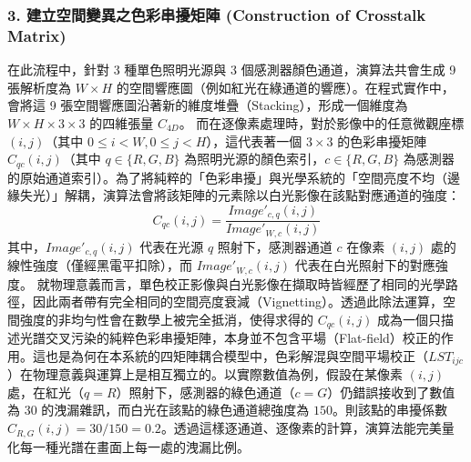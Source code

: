 \subsubsection*{3. 建立空間變異之色彩串擾矩陣 (Construction of Crosstalk Matrix)}
在此流程中，針對 3 種單色照明光源與 3 個感測器顏色通道，演算法共會生成 9 張解析度為 $W \times H$ 的空間響應圖（例如紅光在綠通道的響應）。在程式實作中，會將這 9 張空間響應圖沿著新的維度堆疊（Stacking），形成一個維度為 $W \times H \times 3 \times 3$ 的四維張量 $C_{4D}$。
而在逐像素處理時，對於影像中的任意微觀座標 $(i, j)$（其中 $0 \leq i < W, 0 \leq j < H$），這代表著一個 $3 \times 3$ 的色彩串擾矩陣 $C_{qc}(i, j)$（其中 $q \in \{R, G, B\}$ 為照明光源的顏色索引，$c \in \{R, G, B\}$ 為感測器的原始通道索引）。為了將純粹的「色彩串擾」與光學系統的「空間亮度不均（邊緣失光）」解耦，演算法會將該矩陣的元素除以白光影像在該點對應通道的強度：
\begin{equation}
    C_{qc}(i, j) = \frac{Image'_{c, q}(i, j)}{Image'_{W, c}(i, j)}
\end{equation}
其中，$Image'_{c, q}(i, j)$ 代表在光源 $q$ 照射下，感測器通道 $c$ 在像素 $(i, j)$ 處的線性強度（僅經黑電平扣除），而 $Image'_{W, c}(i, j)$ 代表在白光照射下的對應強度。
就物理意義而言，單色校正影像與白光影像在擷取時皆經歷了相同的光學路徑，因此兩者帶有完全相同的空間亮度衰減（Vignetting）。透過此除法運算，空間強度的非均勻性會在數學上被完全抵消，使得求得的 $C_{qc}(i, j)$ 成為一個只描述光譜交叉污染的純粹色彩串擾矩陣，本身並不包含平場（Flat-field）校正的作用。這也是為何在本系統的四矩陣耦合模型中，色彩解混與空間平場校正（$LST_{ijc}$）在物理意義與運算上是相互獨立的。以實際數值為例，假設在某像素 $(i, j)$ 處，在紅光（$q=R$）照射下，感測器的綠色通道（$c=G$）仍錯誤接收到了數值為 $30$ 的洩漏雜訊，而白光在該點的綠色通道總強度為 $150$。則該點的串擾係數 $C_{R, G}(i, j) = 30 / 150 = 0.2$。透過這樣逐通道、逐像素的計算，演算法能完美量化每一種光譜在畫面上每一處的洩漏比例。


